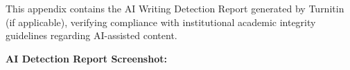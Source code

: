 This appendix contains the AI Writing Detection Report generated 
by Turnitin (if applicable), verifying compliance with institutional 
academic integrity guidelines regarding AI-assisted content.

\textbf{AI Detection Report Screenshot:}

